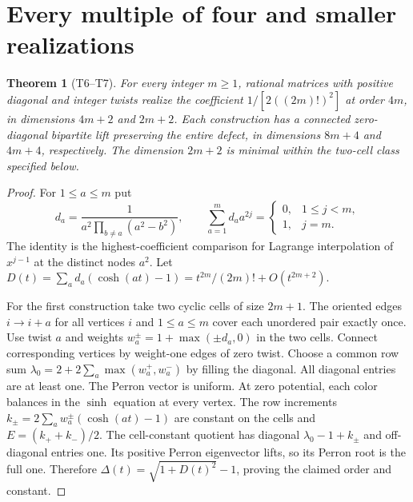 \documentclass[11pt]{article}
\newtheorem{theorem}{Theorem}
\begin{document}
\section{Every multiple of four and smaller realizations}
\begin{theorem}[T6--T7]
For every integer \(m\geq1\), rational matrices with positive diagonal
and integer twists realize the coefficient \(1/[2((2m)!)^2]\) at order
\(4m\), in dimensions \(4m+2\) and \(2m+2\). Each construction has a
connected zero-diagonal bipartite lift preserving the entire defect,
in dimensions \(8m+4\) and \(4m+4\), respectively.
The dimension \(2m+2\) is minimal within the two-cell class specified below.
\end{theorem}
\begin{proof}
For \(1\leq a\leq m\) put
\[
 d_a=\frac{1}{a^2\prod_{b\ne a}(a^2-b^2)},\qquad
 \sum_{a=1}^m d_a a^{2j}=\begin{cases}0,&1\leq j<m,\\1,&j=m.\end{cases}
\]
The identity is the highest-coefficient comparison for Lagrange
interpolation of \(x^{j-1}\) at the distinct nodes \(a^2\).
Let \(D(t)=\sum_a d_a(\cosh(at)-1)=t^{2m}/(2m)!+O(t^{2m+2})\).

For the first construction take two cyclic cells of size \(2m+1\).
The oriented edges \(i\to i+a\) for all vertices \(i\) and \(1\leq a\leq m\)
cover each unordered pair exactly once. Use twist \(a\) and weights
\(w_a^\pm=1+\max(\pm d_a,0)\) in the two cells. Connect corresponding
vertices by weight-one edges of zero twist. Choose a common row sum
\(\lambda_0=2+2\sum_a\max(w_a^+,w_a^-)\) by filling the diagonal.
All diagonal entries are at least one. The Perron vector is uniform.
At zero potential, each color balances in the \(\sinh\) equation at
every vertex. The row increments \(k_\pm=2\sum_a w_a^\pm(\cosh(at)-1)\)
are constant on the cells and \(E=(k_++k_-)/2\).
The cell-constant quotient has diagonal
\(\lambda_0-1+k_\pm\) and off-diagonal entries one. Its positive
Perron eigenvector lifts, so its Perron root is the full one. Therefore
\(\Delta(t)=\sqrt{1+D(t)^2}-1\), proving the claimed order and constant.


\end{proof}
\end{document}
